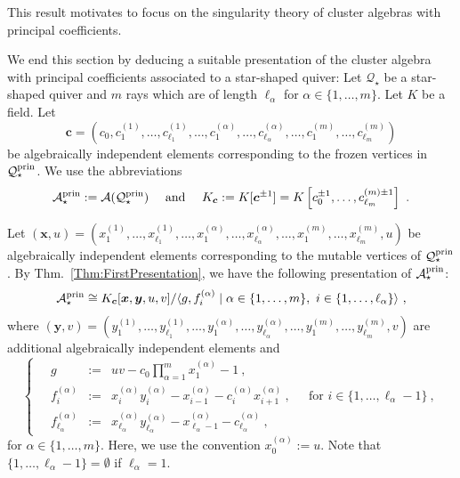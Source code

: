 \documentclass[letter,11pt]{amsart}
\newcommand{\KK}{\ensuremath{K}} %
\newcommand{\prin}{{\rm prin}}
\newcommand{\cA}{\mathcal{A}}
\newcommand{\cQ}{\mathcal{Q}}
\renewcommand{\c}{{\boldsymbol{c}}}
\newcommand{\x}{\boldsymbol{x}}
\newcommand{\y}{\boldsymbol{y}}
\theoremstyle{theorem}
\theoremstyle{definition}
\newcommand{\len}{\ell}
\numberwithin{equation}{section}
\begin{document}
This result motivates to focus on the singularity theory of cluster algebras with principal coefficients.

We end this section by deducing a suitable presentation of the cluster algebra with principal coefficients associated to a star-shaped quiver:
Let $ \cQ_\star $ be a star-shaped quiver and $ m $ rays which are of length $ \len_\alpha $ for $ \alpha \in \{ 1, \ldots, m \} $. 
Let $ \KK $ be a field.
Let  
\[  
	\c = (c_0, c_1^{(1)}, \ldots, c_{\len_1}^{(1)}, \ldots, c_1^{(\alpha)}, \ldots, c_{\len_\alpha}^{(\alpha)}, \ldots, c_1^{(m)}, \ldots, c_{\len_m}^{(m)} ) 
\] 
be algebraically independent elements
corresponding to the frozen vertices in $ \cQ_\star^\prin $.
We use the abbreviations
\[
	\cA_\star^\prin :=\cA(\cQ_\star^\prin )
	\quad 
	\mbox{ and } 
	\quad 
	K_\c := K[\c^{\pm 1}]
	= K\left[c_0^{\pm 1}, \ldots, c_{\len_m}^{(m) \pm 1}  \right]
	\ . 
\]

Let $ (\x, u ) = (x_1^{(1)}, \ldots, x_{\len_1}^{(1)}, \ldots, x_1^{(\alpha)}, \ldots, x_{\len_\alpha}^{(\alpha)}, \ldots, x_1^{(m)}, \ldots, x_{\len_m}^{(m)}, u ) $ be algebraically independent elements
corresponding to the mutable vertices of $ \cQ_\star^\prin $. 
By Thm.~\ref{Thm:FirstPresentation},
we have the following presentation of $ \cA_\star^\prin $:  %
\begin{equation} 
	\label{eq:A_star}
	\cA_\star^\prin \cong 
	\KK_\c [\x , \y,  u, v  ] / \langle g,  f_i^{(\alpha)} \mid \alpha \in \{ 1, \ldots, m \},
\ 
i \in \{1, \ldots, \len_\alpha \} \rangle \ ,  
\end{equation} 
where $ (\y, v ) = (y_1^{(1)}, \ldots, y_{\len_1}^{(1)}, \ldots, y_1^{(\alpha)}, \ldots, y_{\len_\alpha}^{(\alpha)}, \ldots, y_1^{(m)}, \ldots, y_{\len_m}^{(m)}, v ) $ are additional algebraically independent elements
and
\begin{equation}
	\label{eq:gen-original}
	\left\{ \quad
	\begin{array}{rcll}
		g 
		& := &	
		\displaystyle 
		u v  - c_0 \prod_{\alpha=1}^m x_1^{(\alpha)} - 1 \ ,
		\\[15pt]
		f_{i}^{(\alpha)} 
		& := &
		x_i^{(\alpha)} y_i^{(\alpha)} - x_{i-1}^{(\alpha)} - c_i^{(\alpha)} x_{i+1}^{(\alpha)}  \ ,
		&
		\ \ \ 
		\mbox{for } i \in \{ 1, \ldots, \len_\alpha - 1 \} \ ,
		\\[10pt]
		f_{\len_\alpha}^{(\alpha)} 
		& := &
		x_{\len_\alpha}^{(\alpha)} y_{\len_\alpha}^{(\alpha)} - x_{\len_\alpha-1}^{(\alpha)} - c_{\len_\alpha}^{(\alpha)}   \ , 
	\end{array}
	\right.
\end{equation}
for $ \alpha \in \{ 1, \ldots, m \} $.
Here, we use the convention $ x_{0}^{(\alpha)} := u $.
Note that $ \{ 1, \ldots, \len_\alpha - 1 \} = \emptyset $ if $ \ell_\alpha = 1 $.
\end{document}
